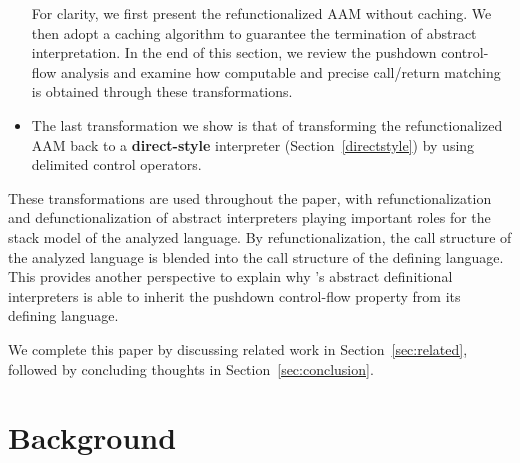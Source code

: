 \documentclass[acmsmall, review]{acmart}\settopmatter{}
\begin{document}
\begin{itemize}
    For clarity, we first present the refunctionalized AAM without caching. 
    We then adopt a caching algorithm \cite{darais2017abstracting} to guarantee the termination 
    of abstract interpretation.
    In the end of this section, we review the pushdown control-flow analysis and examine how 
    computable and precise call/return matching is obtained through these transformations.

  \item The last transformation we show is that of transforming the refunctionalized AAM back to a
    \textbf{direct-style} interpreter (Section~\ref{directstyle}) by using delimited control operators.
\end{itemize}

These transformations are used throughout the paper, with refunctionalization and
defunctionalization of abstract interpreters playing important roles for the stack model of
the analyzed language. By refunctionalization, the call structure of the analyzed language
is blended into the call structure of the defining language. This provides another perspective to
explain why \citeauthor{darais2017abstracting}'s abstract definitional interpreters
is able to inherit the pushdown control-flow property from its defining language.

We complete this paper by discussing related work in Section~\ref{sec:related}, followed by 
concluding thoughts in Section~\ref{sec:conclusion}.

\iffalse
\subsection{Style}

We use Scala language to demonstrate the idea and each step of transformations.
We expect that readers have moderate familiarity to Scala's syntax, such as
case classes, pattern matching and for comprehension.

There are two main reasons we use a real-world language:
1) The code does not diminish the accuracy of the material than formal and mathematical
notations, which are heavily used in other static analysis or semantics papers.
The Scala code in this paper can be easily back-translated into formal notations.
2) As a functional pearl, the code in this paper is executable with only few changes,
which make it particularly fit for presenting syntactical transformations on abstract
interpreters.
\fi

\section{Background} \label{background}
\end{document}
